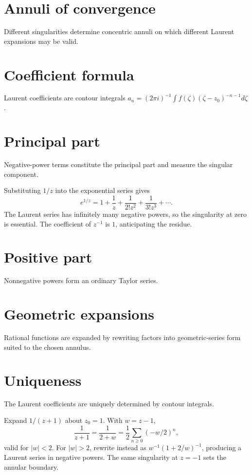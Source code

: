 \section{Annuli of convergence}
Different singularities determine concentric annuli on which different Laurent expansions may be valid.

\section{Coefficient formula}
Laurent coefficients are contour integrals $a_n=(2\pi i)^{-1}\int f(\zeta)(\zeta-z_0)^{-n-1}d\zeta$.

\section{Principal part}
Negative-power terms constitute the principal part and measure the singular component.

\begin{example}\label{ex:iv08-expand-02}
Substituting \(1/z\) into the exponential series gives
\[
e^{1/z}=1+\frac1z+\frac1{2!z^2}+\frac1{3!z^3}+\cdots.
\]
The Laurent series has infinitely many negative powers, so the singularity at zero is essential. The coefficient of \(z^{-1}\) is \(1\), anticipating the residue.
\end{example}
\section{Positive part}
Nonnegative powers form an ordinary Taylor series.

\section{Geometric expansions}
Rational functions are expanded by rewriting factors into geometric-series form suited to the chosen annulus.

\section{Uniqueness}
The Laurent coefficients are uniquely determined by contour integrals.

\begin{example}\label{ex:iv08-expand-03}
Expand \(1/(z+1)\) about \(z_0=1\). With \(w=z-1\),
\[
\frac1{z+1}=\frac1{2+w}=\frac12\sum_{n\ge0}(-w/2)^n,
\]
valid for \(|w|<2\). For \(|w|>2\), rewrite instead as \(w^{-1}(1+2/w)^{-1}\), producing a Laurent series in negative powers. The same singularity at \(z=-1\) sets the annular boundary.
\end{example}
